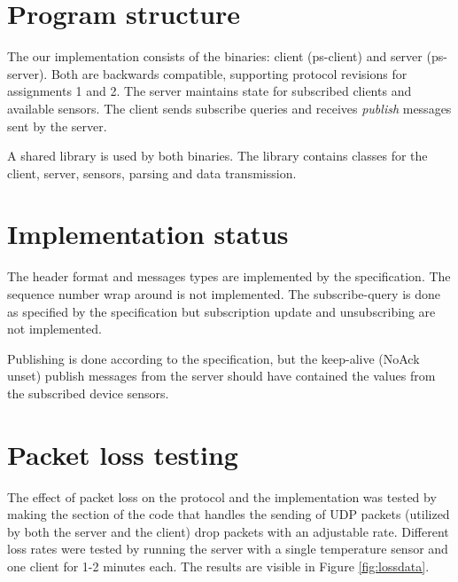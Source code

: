 \documentclass[a4paper]{article}
\begin{document}


\tableofcontents
\newpage

\section{Program structure}
The our implementation consists of the binaries: client (ps-client) and server
(ps-server). Both are backwards compatible, supporting protocol revisions for
assignments 1 and 2. The server maintains state for subscribed clients and
available sensors. The client sends subscribe queries and receives \emph{publish}
messages sent by the server.

A shared library is used by both binaries. The library contains classes for
the client, server, sensors, parsing and data transmission.

\section{Implementation status}
The header format and messages types are implemented by the specification.
The sequence number wrap around is not implemented. The subscribe-query is done
as specified by the specification but subscription update and unsubscribing
are not implemented.

Publishing is done according to the specification, but the keep-alive (NoAck
unset) publish messages from the server should have contained the values from
the subscribed device sensors.


\section{Packet loss testing}

The effect of packet loss on the protocol and the implementation was tested by 
making the section of the code that handles the sending of UDP packets (utilized
by both the server and the client) drop packets with an adjustable rate.
Different loss rates were tested by running the server with a single temperature
sensor and one client for 1-2 minutes each. The results are visible in Figure 
\ref{fig:lossdata}.
\end{document}
